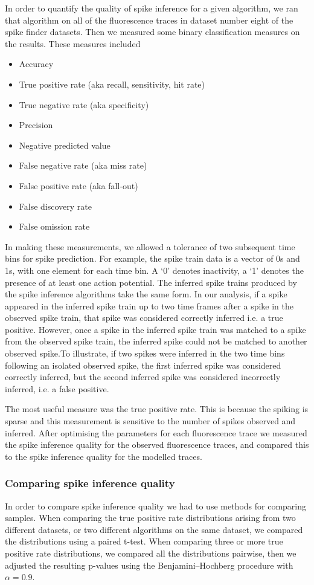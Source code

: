 \documentclass[a4paper,12pt]{article}
\theoremstyle{definition}
\begin{document}
In order to quantify the quality of spike inference for a given algorithm, we ran that algorithm on all of the fluorescence traces in dataset number eight of the spike finder datasets. Then we measured some binary classification measures on the results. These measures included
\begin{itemize}
    \item Accuracy
    \item True positive rate (aka recall, sensitivity, hit rate)
    \item True negative rate (aka specificity)
    \item Precision
    \item Negative predicted value
    \item False negative rate (aka miss rate)
    \item False positive rate (aka fall-out)
    \item False discovery rate
    \item False omission rate
\end{itemize}
In making these measurements, we allowed a tolerance of two subsequent time bins for spike prediction. For example, the spike train data is a vector of 0s and 1s, with one element for each time bin. A `0' denotes inactivity, a `1' denotes the presence of at least one action potential. The inferred spike trains produced by the spike inference algorithms take the same form. In our analysis, if a spike appeared in the inferred spike train up to two time frames after a spike in the observed spike train, that spike was considered correctly inferred i.e. a true positive. However, once a spike in the inferred spike train was matched to a spike from the observed spike train, the inferred spike could not be matched to another observed spike.To illustrate, if two spikes were inferred in the two time bins following an isolated observed spike, the first inferred spike was considered correctly inferred, but the second inferred spike was considered incorrectly inferred, i.e. a false positive.

The most useful measure was the true positive rate. This is because the spiking is sparse and this measurement is sensitive to the number of spikes observed and inferred. After optimising the parameters for each fluorescence trace we measured the spike inference quality for the observed fluorescence traces, and compared this to the spike inference quality for the modelled traces.

\subsubsection{Comparing spike inference quality}
In order to compare spike inference quality we had to use methods for comparing samples. When comparing the true positive rate distributions arising from two different datasets, or two different algorithms on the same dataset, we compared the distributions using a paired t-test. When comparing three or more true positive rate distributions, we compared all the distributions pairwise, then we adjusted the resulting p-values using the Benjamini–Hochberg procedure with $\alpha = 0.9$.
\end{document}
